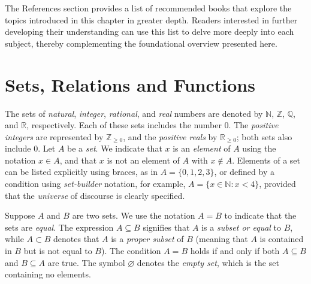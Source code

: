 The References section provides a list of recommended books that explore the topics introduced in this chapter in greater depth. Readers interested in further developing their understanding can use this list to delve more deeply into each subject, thereby complementing the foundational overview presented here.

%
%

\section{Sets, Relations and Functions}
\label{sec:sets}

The sets of \emph{natural}, \emph{integer}, \emph{rational}, and \emph{real} numbers are denoted by $\mathbb{N}$, $\mathbb{Z}$, $\mathbb{Q}$, and $\mathbb{R}$, respectively. Each of these sets includes the number $0$. The \emph{positive integers} are represented by $\mathbb{Z}_{\geq 0}$, and the \emph{positive reals} by $\mathbb{R}_{\geq 0}$; both sets also include $0$. Let $A$ be a \emph{set}. We indicate that $x$ is an \emph{element} of $A$ using the notation $x \in A$, and that $x$ is not an element of $A$ with $x \notin A$. Elements of a set can be listed explicitly using braces, as in $A = \{0, 1, 2, 3\}$, or defined by a condition using \emph{set-builder} notation, for example, $A = \{x \in \mathbb{N} : x < 4\}$, provided that the \emph{universe} of discourse is clearly specified.

Suppose $A$ and $B$ are two sets. We use the notation $A = B$ to indicate that the sets are \emph{equal}. The expression $A \subseteq B$ signifies that $A$ is a \emph{subset or equal} to $B$, while $A \subset B$ denotes that $A$ is a \emph{proper subset} of $B$ (meaning that $A$ is contained in $B$ but is not equal to $B$). The condition $A = B$ holds if and only if both $A \subseteq B$ and $B \subseteq A$ are true. The symbol $\varnothing$ denotes the \emph{empty set}, which is the set containing no elements.


